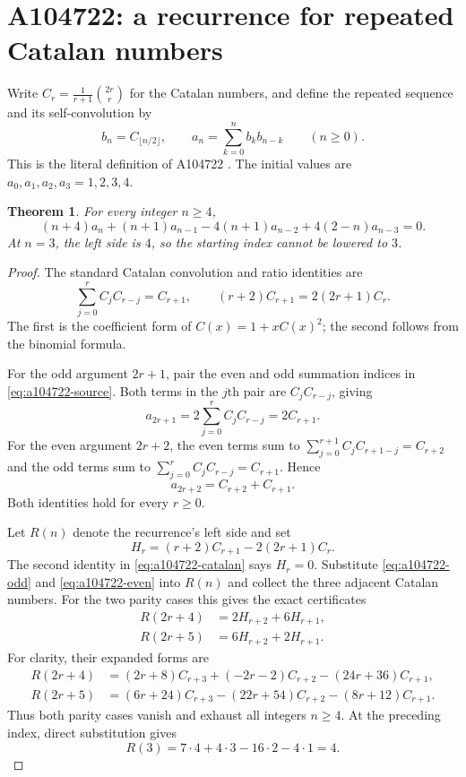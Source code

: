 \documentclass[11pt]{article}
\newtheorem{theorem}{Theorem}[section]
\begin{document}
\section{A104722: a recurrence for repeated Catalan numbers}

Write $C_r=\frac1{r+1}\binom{2r}{r}$ for the Catalan numbers, and
define the repeated sequence and its self-convolution by
\begin{equation}\label{eq:a104722-source}
 b_n=C_{\lfloor n/2\rfloor},\qquad
 a_n=\sum_{k=0}^{n}b_kb_{n-k}\qquad(n\ge0).
\end{equation}
This is the literal definition of A104722 \cite{a104722-source}.
The initial values are $a_0,a_1,a_2,a_3=1,2,3,4$.

\begin{theorem}\label{thm:a104722}
For every integer $n\ge4$,
\[
 (n+4)a_n+(n+1)a_{n-1}
 -4(n+1)a_{n-2}+4(2-n)a_{n-3}=0.
\]
At $n=3$, the left side is $4$, so the starting index cannot be
lowered to $3$.
\end{theorem}

\begin{proof}
The standard Catalan convolution and ratio identities are
\begin{equation}\label{eq:a104722-catalan}
 \sum_{j=0}^{r}C_jC_{r-j}=C_{r+1},\qquad
 (r+2)C_{r+1}=2(2r+1)C_r.
\end{equation}
The first is the coefficient form of $C(x)=1+xC(x)^2$;
the second follows from the binomial formula.

For the odd argument $2r+1$, pair the even and odd summation
indices in \eqref{eq:a104722-source}. Both terms in the $j$th
pair are $C_jC_{r-j}$, giving
\begin{equation}\label{eq:a104722-odd}
 a_{2r+1}=2\sum_{j=0}^{r}C_jC_{r-j}=2C_{r+1}.
\end{equation}
For the even argument $2r+2$, the even terms sum to
$\sum_{j=0}^{r+1}C_jC_{r+1-j}=C_{r+2}$ and the odd terms sum to
$\sum_{j=0}^{r}C_jC_{r-j}=C_{r+1}$. Hence
\begin{equation}\label{eq:a104722-even}
 a_{2r+2}=C_{r+2}+C_{r+1}.
\end{equation}
Both identities hold for every $r\ge0$.

Let $R(n)$ denote the recurrence's left side and set
\[
 H_r=(r+2)C_{r+1}-2(2r+1)C_r.
\]
The second identity in \eqref{eq:a104722-catalan} says $H_r=0$.
Substitute \eqref{eq:a104722-odd} and \eqref{eq:a104722-even}
into $R(n)$ and collect the three adjacent Catalan numbers.
For the two parity cases this gives the exact certificates
\begin{align*}
 R(2r+4)&=2H_{r+2}+6H_{r+1},\\
 R(2r+5)&=6H_{r+2}+2H_{r+1}.
\end{align*}
For clarity, their expanded forms are
\[
\begin{aligned}
R(2r+4)
 &=(2r+8)C_{r+3}+(-2r-2)C_{r+2}-(24r+36)C_{r+1},\\
R(2r+5)
 &=(6r+24)C_{r+3}-(22r+54)C_{r+2}-(8r+12)C_{r+1}.
\end{aligned}
\]
Thus both parity cases vanish and exhaust all integers $n\ge4$.
At the preceding index, direct substitution gives
\[
 R(3)=7\cdot4+4\cdot3-16\cdot2-4\cdot1=4.
\]
\end{proof}
\end{document}
